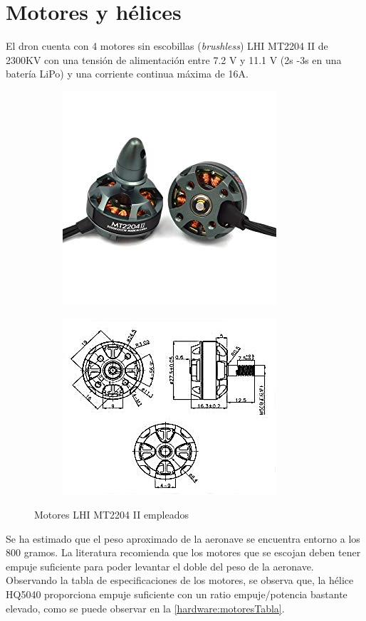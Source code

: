 \section{Motores y hélices}
El dron cuenta con 4 motores sin escobillas (\textit{brushless}) LHI MT2204 II de 2300KV con una tensión de alimentación entre 7.2 V y 11.1 V (2s -3s en una batería LiPo) y una corriente continua máxima de 16A.

\begin{figure}[htb!]
	\centering
	\begin{subfigure}{0.4\textwidth}
		\centering
		\includegraphics[height=0.2\textheight]{hardware/motores.jpg}
	\end{subfigure}
	\begin{subfigure}{0.4\textwidth}
	\centering
	\includegraphics[height=0.2\textheight]{hardware/motoresPlanos}
\end{subfigure}
	\caption{Motores LHI MT2204 II empleados}
\label{hardware:motores}
\end{figure}

Se ha estimado que el peso aproximado de la aeronave se encuentra entorno a los 800 gramos. La literatura recomienda que los motores que se escojan deben tener empuje suficiente para poder levantar el doble del peso de la aeronave. Observando la tabla de especificaciones de los motores, se observa que, la hélice HQ5040 proporciona empuje suficiente con un ratio empuje/potencia bastante elevado, como se puede observar en la \cref{hardware:motoresTabla}.

